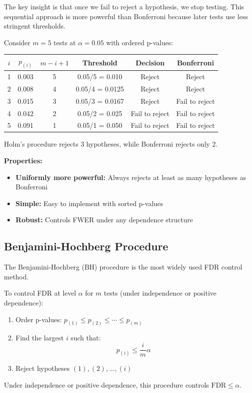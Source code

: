 The key insight is that once we fail to reject a hypothesis, we stop testing. This sequential approach is more powerful than Bonferroni because later tests use less stringent thresholds.

\begin{example}
Consider $m = 5$ tests at $\alpha = 0.05$ with ordered p-values:

\begin{center}
\begin{tabular}{cccccc}
\toprule
$i$ & $p_{(i)}$ & $m - i + 1$ & Threshold & Decision & Bonferroni \\
\midrule
1 & 0.003 & 5 & 0.05/5 = 0.010 & Reject & Reject \\
2 & 0.008 & 4 & 0.05/4 = 0.0125 & Reject & Reject \\
3 & 0.015 & 3 & 0.05/3 = 0.0167 & Reject & Fail to reject \\
4 & 0.042 & 2 & 0.05/2 = 0.025 & Fail to reject & Fail to reject \\
5 & 0.091 & 1 & 0.05/1 = 0.050 & Fail to reject & Fail to reject \\
\bottomrule
\end{tabular}
\end{center}

Holm's procedure rejects 3 hypotheses, while Bonferroni rejects only 2.
\end{example}

\textbf{Properties:}
\begin{itemize}
    \item \textbf{Uniformly more powerful:} Always rejects at least as many hypotheses as Bonferroni
    \item \textbf{Simple:} Easy to implement with sorted p-values
    \item \textbf{Robust:} Controls FWER under any dependence structure
\end{itemize}

\subsection{Benjamini-Hochberg Procedure}

The Benjamini-Hochberg (BH) procedure is the most widely used FDR control method.

\begin{theorem}
To control FDR at level $\alpha$ for $m$ tests (under independence or positive dependence):
\begin{enumerate}
    \item Order p-values: $p_{(1)} \leq p_{(2)} \leq \cdots \leq p_{(m)}$
    \item Find the largest $i$ such that:
    \begin{equation}
    p_{(i)} \leq \frac{i}{m} \alpha
    \end{equation}
    \item Reject hypotheses $(1), (2), \ldots, (i)$
\end{enumerate}

Under independence or positive dependence, this procedure controls $\text{FDR} \leq \alpha$.
\end{theorem}

